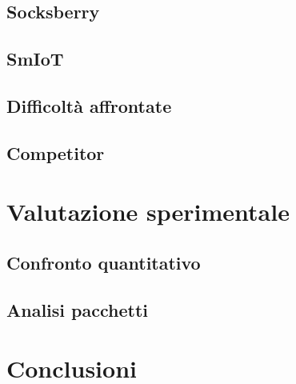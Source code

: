 \documentclass[a4paper, 12pt] {report}
\begin{document}
\section{Socksberry}

\section{SmIoT}

\section{Difficoltà affrontate}

\section{Competitor}


\newpage
\thispagestyle{empty}
\mbox{}

\chapter{Valutazione sperimentale}

\section{Confronto quantitativo}

\section{Analisi pacchetti}


\newpage
\thispagestyle{empty}
\mbox{}

\chapter{Conclusioni}


\medskip
\newrefcontext[sorting=none]
\printbibliography[heading=bibintoc, title={Bibliografia}]
\end{document}
